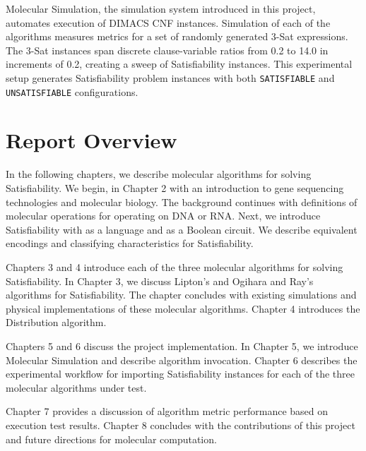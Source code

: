 Molecular Simulation, the simulation system introduced in this project, automates execution of DIMACS CNF instances.  Simulation of each of the algorithms measures metrics for a set of randomly generated $3$-{\sc Sat} expressions.  The $3$-{\sc Sat} instances span discrete clause-variable ratios from 0.2 to 14.0 in increments of 0.2, creating a sweep of {\sc Satisfiability} instances.  This experimental setup generates {\sc Satisfiability} problem instances with both \texttt{SATISFIABLE} and \texttt{UNSATISFIABLE} configurations.

\section{Report Overview}

In the following chapters, we describe molecular algorithms for solving {\sc Satisfiability}.  We begin, in Chapter 2 with an introduction to gene sequencing technologies and molecular biology.  The background continues with definitions of molecular operations for operating on DNA or RNA.  Next, we introduce {\sc Satisfiability} with as a language and as a Boolean circuit.  We describe equivalent encodings and classifying characteristics for {\sc Satisfiability}.

Chapters 3 and 4 introduce each of the three molecular algorithms for solving {\sc Satisfiability}.  In Chapter 3, we discuss Lipton's \cite{Lipton95usingdna, dnaComputingModels2008} and Ogihara and Ray's \cite{Ogihara:1996:BFS:898228, Ogihara97dna-basedparallel, dnaBasedImplemetation_Yoshida2000} algorithms for {\sc Satisfiability}.  The chapter concludes with existing simulations and physical implementations of these molecular algorithms.  Chapter 4 introduces the Distribution algorithm.

Chapters 5 and 6 discuss the project implementation.  In Chapter 5, we introduce Molecular Simulation and describe algorithm invocation.  Chapter 6 describes the experimental workflow for importing {\sc Satisfiability} instances for each of the three molecular algorithms under test.

Chapter 7 provides a discussion of algorithm metric performance based on execution test results.  Chapter 8 concludes with the contributions of this project and future directions for molecular computation.
